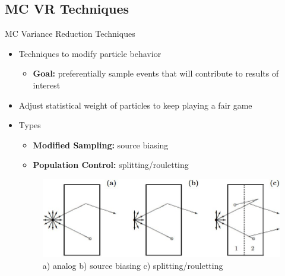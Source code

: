 \documentclass{beamer}
\begin{document}
\subsection{MC VR Techniques}
\begin{frame}{MC Variance Reduction Techniques}
\begin{itemize}
\item{Techniques to modify particle behavior}
   \begin{itemize}
	\item{\textbf{Goal:} preferentially sample events that will contribute to results of interest}
   \end{itemize}
\item{Adjust statistical weight of particles to keep playing a fair game}
\item{Types}
	\begin{itemize}
		\item{\textbf{Modified Sampling:} source biasing}
		\item{\textbf{Population Control:} splitting/rouletting}
	\end{itemize}
                \begin{figure}
			\vspace{0.5cm}
			\hspace{-1cm}
		\includegraphics[scale=0.44]{vr_types.jpg}
			\caption{a) analog b) source biasing c)
			splitting/rouletting \cite{mcnp_primer}}
		\end{figure}
\end{itemize}
\end{frame}
\end{document}
